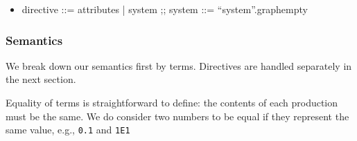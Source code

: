 \begin{itemize}
\begin{itemize}
\item \begin{bnf}
  directive ::= attributes | system ;;
  system ::= ``system''.graph{empty}
\end{bnf}

\end{itemize}


\label{table:grammars}




\subsubsection*{Semantics}
We break down our semantics first by terms. Directives are handled separately in the next section.


Equality of terms is straightforward to define: the contents of each production must be the same. We do consider two numbers to be equal if they represent the same value, e.g.,
\texttt{0.1} and \texttt{1E1}



\end{itemize}
